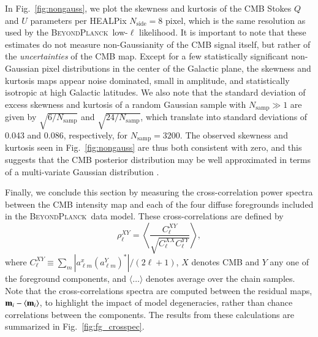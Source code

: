 \documentclass[twocolumn]{aa}
\newcommand{\BP}{\textsc{BeyondPlanck}}
\begin{document}
In Fig.~\ref{fig:nongauss}, we plot the skewness and kurtosis of the
CMB Stokes $Q$ and $U$ parameters per HEALPix $N_{\mathrm{side}}=8$
pixel, which is the same resolution as used by the \BP\ low-$\ell$
likelihood. It is important to note that these estimates do not
measure non-Gaussianity of the CMB signal itself, but rather of the
\emph{uncertainties} of the CMB map. Except for a few statistically
significant non-Gaussian pixel distributions in the center of the
Galactic plane, the skewness and kurtosis maps appear noise dominated,
small in amplitude, and statistically isotropic at high Galactic
latitudes. We also note that the standard deviation of excess skewness
and kurtosis of a random Gaussian sample with $N_{\mathrm{samp}}\gg 1$
are given by $\sqrt{6/N_{\mathrm{samp}}}$ and
$\sqrt{24/N_{\mathrm{samp}}}$, which translate into standard
deviations of 0.043 and 0.086, respectively, for
$N_\mathrm{samp}=3200$. The observed skewness and kurtosis seen in
Fig.~\ref{fig:nongauss} are thus both consistent with zero, and this
suggests that the CMB posterior distribution may be well approximated
in terms of a multi-variate Gaussian distribution \citep{bp12}.

Finally, we conclude this section by measuring the cross-correlation
power spectra between the CMB intensity map and each of the four
diffuse foregrounds included in the \BP\ data model. These
cross-correlations are defined by
\begin{equation}
  \rho^{XY}_{\ell} = \left\langle \frac{C_{\ell}^{XY}}{\sqrt{C_{\ell}^{XX}C_{\ell}^{YY}}} \right\rangle,
\end{equation}
where $C_{\ell}^{XY}\equiv \sum_m|a_{\ell m}^x (a_{\ell m}^Y)^*|/(2\ell+1)$, $X$ denotes CMB and $Y$ any one of the foreground components, and $\langle\ldots\rangle$ denotes average over the chain samples. Note that the cross-correlations spectra are computed between the residual maps, ${\bf m}_i - \langle {\bf m}_i \rangle$, to highlight the impact of model degeneracies, rather than chance correlations between the components.  The results from these calculations are summarized in
Fig.~\ref{fig:fg_crosspec}.
\end{document}

